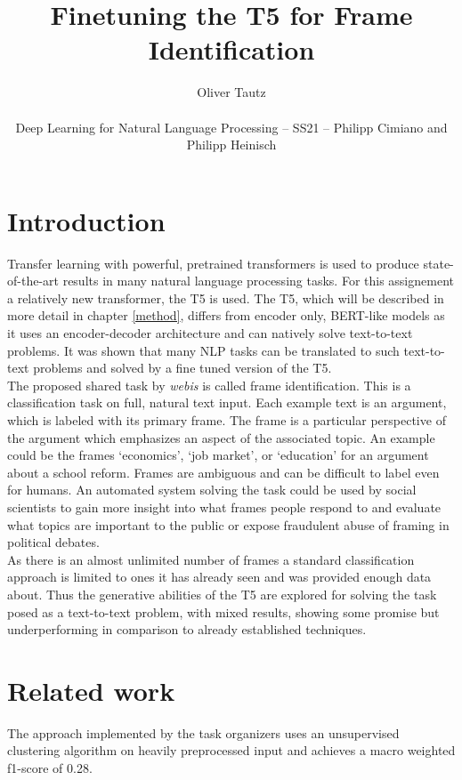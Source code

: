 \documentclass[11pt,a4paper,onecolumn,oneside,notitlepage]{article}
\author{Oliver Tautz\\
	\begin{small}
		Deep Learning for Natural Language Processing -- SS21 -- Philipp Cimiano and Philipp Heinisch
	\end{small}
}
\title{Finetuning the T5 for Frame Identification}
\begin{document}
	\maketitle
	
	\section{Introduction}
Transfer learning with powerful, pretrained transformers is used to produce state-of-the-art results in many natural language processing tasks. \citep{wolf-etal-2020-transformers} For this assignement a relatively new transformer, the T5 \citep{T5} is used. The T5, which will be described in more detail in chapter \ref{method}, differs from encoder only, BERT-like \citep{bert} models as it uses an encoder-decoder architecture and can natively solve text-to-text problems. It was shown that many NLP tasks can be translated to such text-to-text problems and solved by a fine tuned version of the T5.\citep{T5}\\


The proposed shared task by \textit{webis} \citep{webis_task} is called frame identification. This is a classification task on full, natural text input. Each example text is an argument, which is labeled with its primary frame. The frame is a particular perspective of the argument which emphasizes an aspect of the associated topic. An example could be the frames ‘economics’, ‘job market’, or ‘education’ for an argument about a school reform. Frames are ambiguous and can be difficult to label even for humans. An automated system solving the task could be used by social scientists to gain more insight into what frames people respond to and evaluate what topics are important to the public or expose fraudulent abuse of framing in political debates.\\

As there is an almost unlimited number of frames a standard classification approach is limited to ones it has already seen and was provided enough data about. Thus the generative abilities of the T5 are explored for solving the task posed as a text-to-text problem, with mixed results, showing some promise but underperforming in comparison to already established techniques. 

		
\section{Related work}
The approach implemented by the task organizers \citep{webis_task_paper} uses an unsupervised clustering algorithm on heavily preprocessed input and achieves a macro weighted f1-score of \num{0.28}.\\
\end{document}
